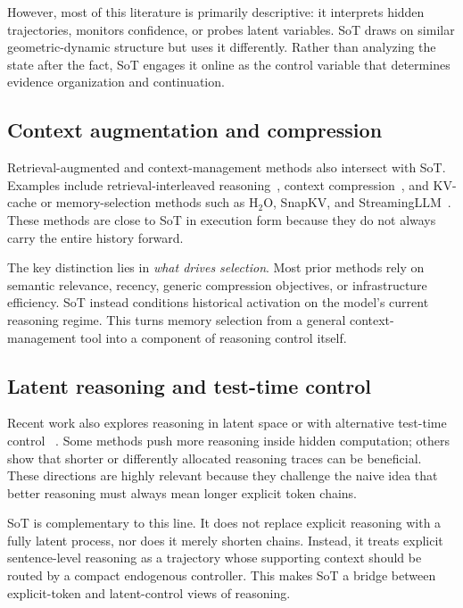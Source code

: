 However, most of this literature is primarily descriptive:
it interprets hidden trajectories, monitors confidence, or probes latent variables.
SoT draws on similar geometric-dynamic structure but uses it differently.
Rather than analyzing the state after the fact, SoT engages it online as the control variable that determines evidence organization and continuation.

\vspace{-1mm}
\subsection{Context augmentation and compression}
\vspace{-1mm}
Retrieval-augmented and context-management methods also intersect with SoT.
Examples include retrieval-interleaved reasoning~\citep{trivedi2023interleaving,wang2024rat}, context compression~\citep{jiang2024longllmlingua,li2023compressing}, and KV-cache or memory-selection methods such as H\(_2\)O, SnapKV, and StreamingLLM~\citep{li2024snapkv,xiao2023streamingllm,zhang2023h2o}.
These methods are close to SoT in execution form because they do not always carry the entire history forward.

The key distinction lies in \emph{what drives selection}.
Most prior methods rely on semantic relevance, recency, generic compression objectives, or infrastructure efficiency.
SoT instead conditions historical activation on the model's current reasoning regime.
This turns memory selection from a general context-management tool into a component of reasoning control itself.

\vspace{-1mm}
\subsection{Latent reasoning and test-time control}
\vspace{-1mm}
Recent work also explores reasoning in latent space or with alternative test-time control ~\citep{hao2025training,hassid2025dont,wang2025system}.
Some methods push more reasoning inside hidden computation; others show that shorter or differently allocated reasoning traces can be beneficial.
These directions are highly relevant because they challenge the naive idea that better reasoning must always mean longer explicit token chains.

SoT is complementary to this line.
It does not replace explicit reasoning with a fully latent process, nor does it merely shorten chains.
Instead, it treats explicit sentence-level reasoning as a trajectory whose supporting context should be routed by a compact endogenous controller.
This makes SoT a bridge between explicit-token and latent-control views of reasoning.

